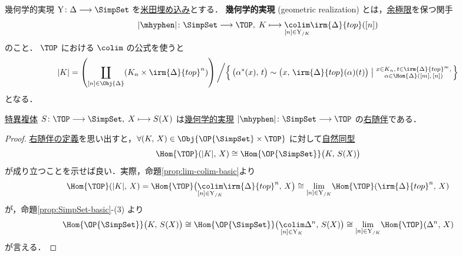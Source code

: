 \documentclass[TQFT_main]{subfiles}
\begin{document}
\begin{mydef}[label=def:geometric-realization]{幾何学的実現}
    $\mathrm{Y} \colon \Delta \lto \SimpSet$ を\hyperref[def:representable]{米田埋め込み}とする．
    \textbf{幾何学的実現} (geometric realization) とは，\hyperref[def:colim]{余極限}を保つ関手
    \begin{align}
        \abs{\mhyphen} \colon \SimpSet \lto \TOP,\; K \lmto \underset{[n] \in \mathrm{Y}_{/K}}{\colim} \irm{\Delta}{top}([n])
    \end{align}
    のこと．
    \tcblower
    $\TOP$ における $\colim$ の公式を使うと
    \begin{align}
        \abs{K} =  \left( \coprod_{[n] \in \Obj{\Delta}} (K_n \times \irm{\Delta}{top}^n)  \right) \bigg/ \Bigl\{\, \bigl(\alpha^*(x),\, t\bigr) \sim \bigl(x,\, \irm{\Delta}{top}(\alpha)(t)\bigr) \bigm| \substack{x \in K_n,\, t \in \irm{\Delta}{top}^m, \\ \alpha \in \Hom{\Delta}([m],\, [n])} \,\Bigr\} 
    \end{align}
    となる．
\end{mydef}

\begin{myprop}[label=prop:geometry-realization]{}
    \hyperref[def:simplicial-top]{特異複体} $S \colon \TOP \lto \SimpSet,\; X \lmto S(X)$ は\hyperref[def:geometric-realization]{幾何学的実現} $\abs{\mhyphen} \colon \SimpSet \lto \TOP$ の\hyperref[def:adjoint]{右随伴}である．
\end{myprop}

\begin{proof}
    \hyperref[def:adjoint]{右随伴の定義}を思い出すと，$\forall (K,\, X) \in \Obj{\OP{\SimpSet} \times \TOP}$ に対して\hyperref[def:nat]{自然同型}
    \begin{align}
        \Hom{\TOP} (\abs{K},\, X) \cong \Hom{\OP{\SimpSet}} \bigl(K,\, S(X)\bigr)
    \end{align}
    が成り立つことを示せば良い．実際，命題\ref{prop:lim-colim-basic}より
    \begin{align}
        \Hom{\TOP} (\abs{K},\, X) = \Hom{\TOP} \bigl( \underset{[n] \in \mathrm{Y}_{/K}}{\colim} \irm{\Delta}{top}^n,\, X \bigr) \cong \underset{[n] \in \mathrm{Y}_{/K}}{\lim} \Hom{\TOP}(\irm{\Delta}{top}^n,\, X)
    \end{align}
    が，命題\ref{prop:SimpSet-basic}-(3) より
    \begin{align}
        \Hom{\OP{\SimpSet}} \bigl(K,\, S(X)\bigr) \cong \Hom{\OP{\SimpSet}} \bigl( \underset{[n] \in \mathrm{Y}_K}{\colim} \Delta^n,\, S(X) \bigr) \cong \underset{[n] \in \mathrm{Y}_{/K}}{\lim} \Hom{\TOP}(\Delta^n,\, X)
    \end{align}
    が言える．
\end{proof}
\end{document}

